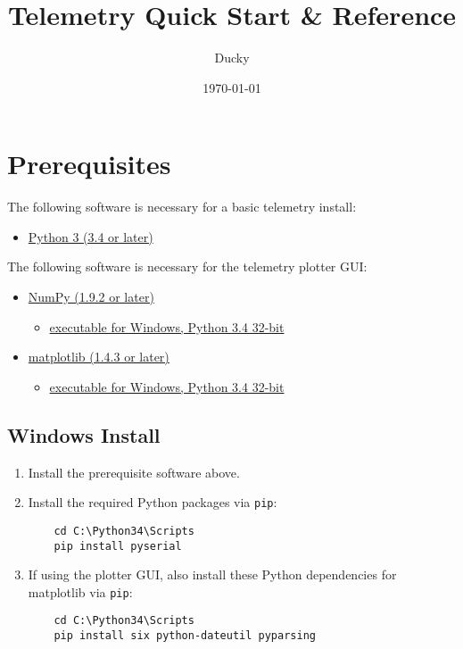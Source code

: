\documentclass[11pt]{article}
\title{\textbf{Telemetry Quick Start \& Reference}}
\author{Ducky}
\date{\today}
\begin{document}
\maketitle

\section{Prerequisites}
\label{sec:prereqs}
The following software is necessary for a basic telemetry install:
\begin{itemize}
  \item \href{https://www.python.org/downloads/}{Python 3 (3.4 or later)}
\end{itemize}

The following software is necessary for the telemetry plotter GUI:
\begin{itemize}
  \item \href{http://sourceforge.net/projects/numpy/files/NumPy/}{NumPy (1.9.2 or later)}
  \begin{itemize}
    \item \href{http://sourceforge.net/projects/numpy/files/NumPy/1.9.2/numpy-1.9.2-win32-superpack-python3.4.exe/download}{executable for Windows, Python 3.4 32-bit}
  \end{itemize}
  \item \href{http://matplotlib.org/downloads.html}{matplotlib (1.4.3 or later)}
  \begin{itemize}
    \item \href{http://sourceforge.net/projects/matplotlib/files/matplotlib/matplotlib-1.4.3/windows/matplotlib-1.4.3.win32-py3.4.exe/download}{executable for Windows, Python 3.4 32-bit}
  \end{itemize}
\end{itemize}

\subsection{Windows Install}
\begin{enumerate}
  \item Install the prerequisite software above.
  \item Install the required Python packages via \texttt{pip}:
  \begin{verbatim}
    cd C:\Python34\Scripts
    pip install pyserial 
  \end{verbatim}
  \item If using the plotter GUI, also install these Python dependencies for matplotlib via \texttt{pip}:
  \begin{verbatim}
    cd C:\Python34\Scripts
    pip install six python-dateutil pyparsing
  \end{verbatim}
\end{enumerate}
\end{document}
